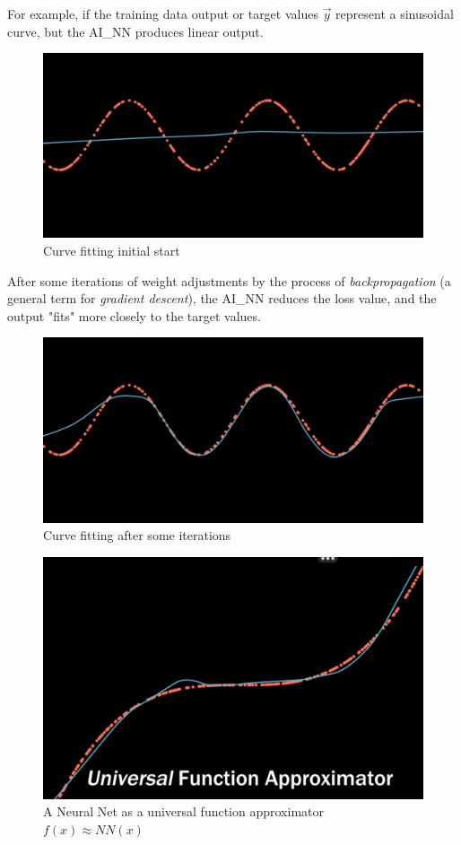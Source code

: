 For example, if the training data output or target values $\vec{y}$ represent a sinusoidal curve, but the \gls{AI_NN} produces linear output.
\begin{figure}[H]
	\centering
	\includegraphics[scale = 0.2]{attachment/chapter_AML/Scc032}
	\caption{Curve fitting initial start}
\end{figure}

After some iterations of weight adjustments by the process of \textit{backpropagation} (a general term for \textit{gradient descent}), the \gls{AI_NN} reduces the loss value, and the output "fits" more closely to the target values.
\begin{figure}[H]
	\centering
	\includegraphics[scale = 0.2]{attachment/chapter_AML/Scc033}
	\caption{Curve fitting after some iterations}
\end{figure}

\begin{figure}[H]
	\centering
	\includegraphics[scale = 0.2]{attachment/chapter_AML/Scc034}
	\caption{A Neural Net as a universal function approximator $f(x) \approx NN(x)$}
\end{figure}

